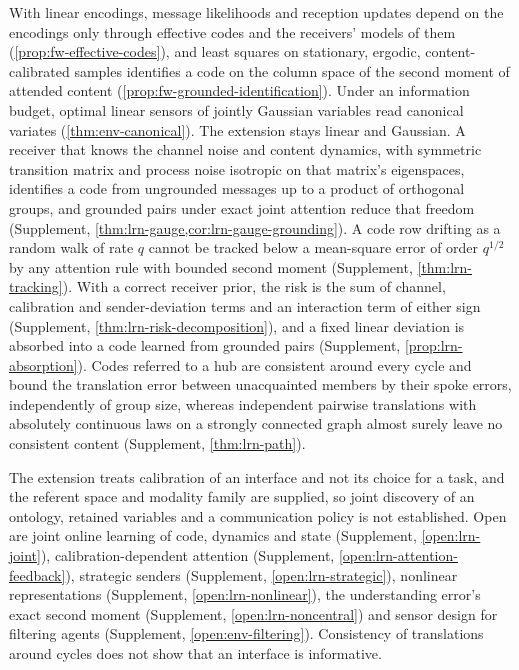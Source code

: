 With linear encodings, message likelihoods and reception updates depend on the encodings only through effective codes and the receivers' models of them (\cref{prop:fw-effective-codes}), and least squares on stationary, ergodic, content-calibrated samples identifies a code on the column space of the second moment of attended content (\cref{prop:fw-grounded-identification}). Under an information budget, optimal linear sensors of jointly Gaussian variables read canonical variates (\cref{thm:env-canonical}). The extension stays linear and Gaussian. A receiver that knows the channel noise and content dynamics, with symmetric transition matrix and process noise isotropic on that matrix's eigenspaces, identifies a code from ungrounded messages up to a product of orthogonal groups, and grounded pairs under exact joint attention reduce that freedom (Supplement, \cref{thm:lrn-gauge,cor:lrn-gauge-grounding}). A code row drifting as a random walk of rate $q$ cannot be tracked below a mean-square error of order $q^{1/2}$ by any attention rule with bounded second moment (Supplement, \cref{thm:lrn-tracking}). With a correct receiver prior, the risk is the sum of channel, calibration and sender-deviation terms and an interaction term of either sign (Supplement, \cref{thm:lrn-risk-decomposition}), and a fixed linear deviation is absorbed into a code learned from grounded pairs (Supplement, \cref{prop:lrn-absorption}). Codes referred to a hub are consistent around every cycle and bound the translation error between unacquainted members by their spoke errors, independently of group size, whereas independent pairwise translations with absolutely continuous laws on a strongly connected graph almost surely leave no consistent content (Supplement, \cref{thm:lrn-path}).

The extension treats calibration of an interface and not its choice for a task, and the referent space and modality family are supplied, so joint discovery of an ontology, retained variables and a communication policy is not established. Open are joint online learning of code, dynamics and state (Supplement, \cref{open:lrn-joint}), calibration-dependent attention (Supplement, \cref{open:lrn-attention-feedback}), strategic senders (Supplement, \cref{open:lrn-strategic}), nonlinear representations (Supplement, \cref{open:lrn-nonlinear}), the understanding error's exact second moment (Supplement, \cref{open:lrn-noncentral}) and sensor design for filtering agents (Supplement, \cref{open:env-filtering}). Consistency of translations around cycles does not show that an interface is informative.

